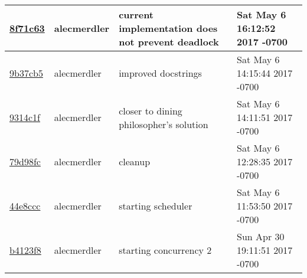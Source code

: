 \begin{tabular}{l l l l}
\href{https://github.com/alecmerdler/cs-444-group-119/commit/8f71c63a10bfc3765be8487bda3569ce52d3ad6a}{8f71c63} & alecmerdler & current implementation does not prevent deadlock & Sat May 6 16:12:52 2017 -0700\\\hline
\href{https://github.com/alecmerdler/cs-444-group-119/commit/9b37cb5b3b331734708d96a86f2a3ca0d2feaab9}{9b37cb5} & alecmerdler & improved docstrings & Sat May 6 14:15:44 2017 -0700\\\hline
\href{https://github.com/alecmerdler/cs-444-group-119/commit/9314c1fddf717564abcad3ecd2247886e962a64f}{9314c1f} & alecmerdler & closer to dining philosopher's solution & Sat May 6 14:11:51 2017 -0700\\\hline
\href{https://github.com/alecmerdler/cs-444-group-119/commit/79d98fc6b43d5d8c9363528696fc8da4b9afc90d}{79d98fc} & alecmerdler & cleanup & Sat May 6 12:28:35 2017 -0700\\\hline
\href{https://github.com/alecmerdler/cs-444-group-119/commit/44e8ccc0f6fd3c0f905660febea3a6162dac6327}{44e8ccc} & alecmerdler & starting scheduler & Sat May 6 11:53:50 2017 -0700\\\hline
\href{https://github.com/alecmerdler/cs-444-group-119/commit/b4123f84505625b4c2af77146950f44633652fda}{b4123f8} & alecmerdler & starting concurrency 2 & Sun Apr 30 19:11:51 2017 -0700\\\hline


\end{tabular}
